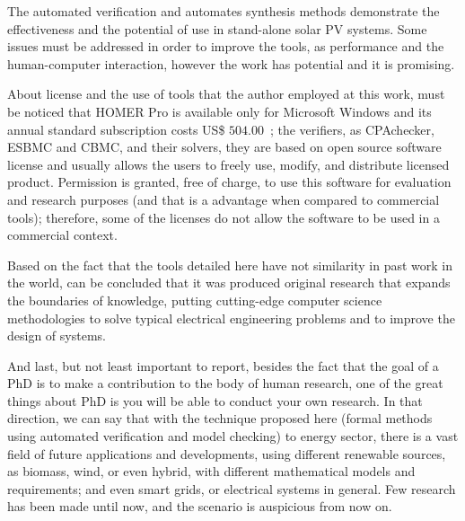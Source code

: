 The automated verification and automates synthesis methods demonstrate the effectiveness and the potential of use in stand-alone solar PV systems. Some issues must be addressed in order to improve the tools, as performance and the human-computer interaction, however the work has potential and it is promising.

About license and the use of tools that the author employed at this work, must be noticed that HOMER Pro is available only for Microsoft Windows and its annual standard subscription costs US\$ $504.00$~\cite{HOMER}; the verifiers, as CPAchecker, ESBMC and CBMC, and their solvers, they are  based on open source software license and usually allows the users to freely use, modify, and distribute licensed product. Permission is granted, free of charge, to use this software for evaluation and research purposes (and that is a advantage when compared to commercial tools); therefore, some of the licenses do not allow the software to be used in a commercial context.

Based on the fact that the tools detailed here have not similarity in past work in the world, can be concluded that it was produced original research that expands the boundaries of knowledge, putting cutting-edge computer science methodologies to solve typical electrical engineering problems and to improve the design of systems.

And last, but not least important to report, besides the fact that the goal of a PhD is to make a contribution to the body of human research, one of the great things about PhD is you will be able to conduct your own research. In that direction, we can say that with the technique proposed here (formal methods using automated verification and model checking) to energy sector, there is a vast field of future applications and developments, using different renewable sources, as biomass, wind, or even hybrid, with different mathematical models and requirements; and even smart grids, or electrical systems in general. Few research has been made until now, and the scenario is auspicious from now on.

